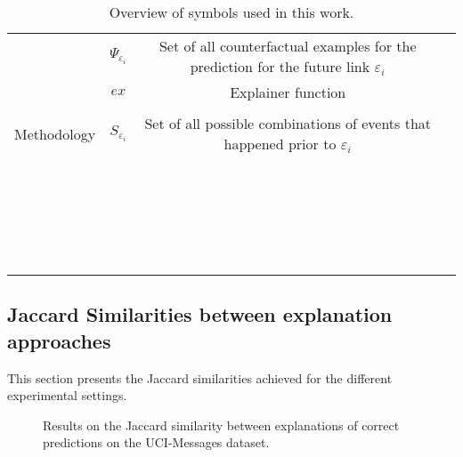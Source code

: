 \begin{table}[ht]
\begin{tabular}{lccl}
 & $\Psi_{\varepsilon_i}$& Set of all counterfactual examples for the prediction for the future link $\varepsilon_i$&\\
 & $ex$& Explainer function&\\
 & & &\\
 Methodology& $S_{\varepsilon_i}$& Set of all possible combinations of events that happened prior to $\varepsilon_i$&\\
 & & &\\
 & & &\\
 & & &\\
 & & &\\
 & & &\\
 & & &\\
 & & &\\
 & & &\\
 & & &\\
 & & &\\
 & & &\\
 & & &\\
 & & &\\
 & & &\\
 & & &\\
 & & &\\
 & & &\\
 & & &\\
 & & &\\
 & & &\\
 & & &\\
 & & &\\
    \end{tabular}
    \caption{Overview of symbols used in this work.}
    \label{t_Appendix_symbols}
\end{table}

\fi

\FloatBarrier
\subsection{Jaccard Similarities between explanation approaches}
\label{s_Appendix_JaccardSimilarities}

This section presents the Jaccard similarities achieved for the different experimental settings.

\begin{figure}[ht]
    \centering
    
    \caption{Results on the Jaccard similarity between explanations of correct predictions on the UCI-Messages dataset.}
\end{figure}

